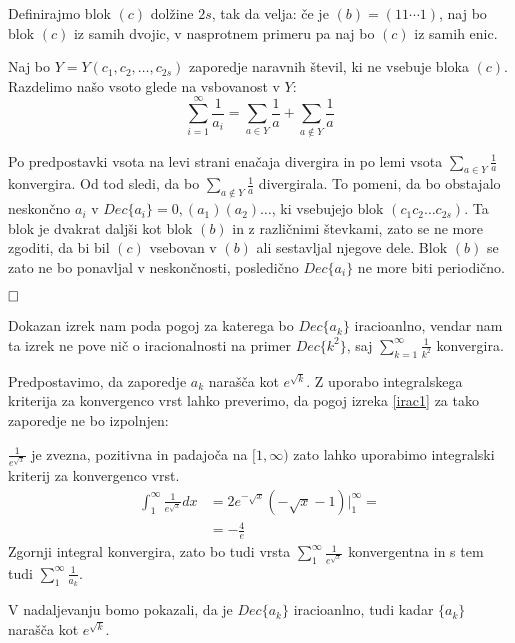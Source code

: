 \documentclass[a4paper,12pt]{article}
\def\qed{$\hfill\Box$}   %
\begin{document}
Definirajmo blok $(c)$ dolžine $2s$, tak da velja: če je $(b) = (11 \cdots 1)$, naj bo blok $(c)$
iz samih dvojic, v nasprotnem primeru pa naj bo $(c)$ iz samih enic.

Naj bo $Y = Y(c_1, c_2, \dots, c_{2s})$ zaporedje naravnih števil, ki ne vsebuje bloka $(c)$.
Razdelimo našo vsoto glede na vsbovanost v $Y$:
\[
    \sum_{i=1}^{\infty} \frac{1}{a_i} = \sum_{a \in Y}\frac{1}{a} + \sum_{a \notin Y} \frac{1}{a}
    \]

Po predpostavki vsota na levi strani enačaja divergira in po lemi vsota $\sum_{a \in Y}\frac{1}{a}$
konvergira. Od tod sledi, da bo $\sum_{a \notin Y} \frac{1}{a}$ divergirala.
To pomeni, da bo obstajalo neskončno $a_i$ v $Dec\{a_i\} = 0,(a_1)(a_2) \dots$, ki vsebujejo blok 
$(c_1c_2\dots c_{2s})$. Ta blok je dvakrat daljši kot blok $(b)$ in z različnimi števkami, zato se ne more
zgoditi, da bi bil $(c)$ vsebovan v $(b)$ ali sestavljal njegove dele. 
Blok $(b)$ se zato ne bo ponavljal v neskončnosti, posledično $Dec\{a_i\}$ ne more biti periodično.

\qed


Dokazan izrek nam poda pogoj za katerega bo $Dec\{a_k\}$ iracioanlno, vendar nam ta izrek
ne pove nič o iracionalnosti na primer $Dec\{k^2\}$, saj $\sum_{k=1}^{\infty}\frac{1}{k^2}$ konvergira.

Predpostavimo, da zaporedje $a_k$ narašča kot $e^{\sqrt{k}}$.
Z uporabo integralskega kriterija za konvergenco vrst lahko preverimo, da pogoj izreka \ref{irac1}
za tako zaporedje ne bo izpolnjen:

$\frac{1}{e^{\sqrt{x}}}$ je zvezna, pozitivna in padajoča na $[1, \infty)$ zato lahko uporabimo
integralski kriterij za konvergenco vrst.
\[
    \begin{split}
    \int_1^{\infty}\frac{1}{e^{\sqrt{x}}}dx &= 2e^{-\sqrt{x}}(- \sqrt{x} - 1) \big|_1^{\infty} = \\
    &= -\frac{4}{e}
    \end{split}
\]
Zgornji integral konvergira, zato bo tudi vrsta $\sum_1^{\infty}\frac{1}{e^{\sqrt{x}}}$ konvergentna in s tem tudi $\sum_1^{\infty}\frac{1}{a_k}$.

V nadaljevanju bomo pokazali, da je $Dec\{a_k\}$ iracioanlno, tudi kadar $\{a_k\}$ narašča kot $e^{\sqrt{k}}$.
\end{document}
